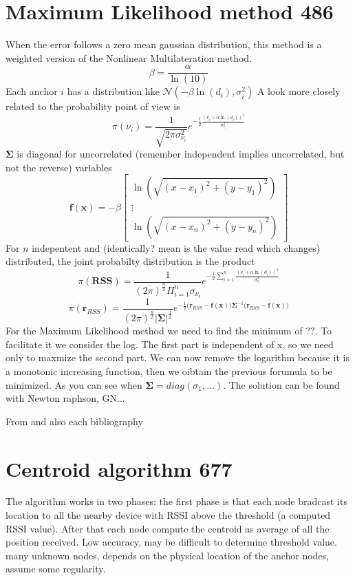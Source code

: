 \documentclass[12pt,twoside]{report}
\begin{document}
\section{Maximum Likelihood method 486}
When the error follows a zero mean gaussian distribution, this method is a weighted version of the Nonlinear Multilateration method. 
\begin{equation}
    \beta=\frac{\alpha}{\ln(10)}
\end{equation}
Each anchor $i$ has a distribution like $\mathcal{N}(-\beta\ln(d_i),\sigma^2_i)$
A look more closely related to the probability point of view is
\begin{equation}
    \pi(\nu_i)=\frac{1}{\sqrt{2\pi\sigma^2_{\nu_i}}}e^{-\frac{1}{2}\frac{(\nu_i+\alpha\ln(d_i))^2}{\sigma^2_{\nu_i}}}
\end{equation}
$\mathbf{\Sigma}$ is diagonal for uncorrelated (remember independent implies uncorrelated, but not the reverse) variables
$$\mathbf{f}(\mathbf{x})=-\beta\begin{bmatrix}
\ln(\sqrt{(x-x_1)^2+(y-y_1)^2})\\
\vdots\\
\ln(\sqrt{(x-x_n)^2+(y-y_n)^2})
\end{bmatrix}$$
For $n$ indepentent and (identically? mean is the value read which changes) distributed, the joint probabilty distribution is the product
\begin{equation}
    \pi(\mathbf{RSS})=\frac{1}{(2\pi)^{\frac{n}{2}}\Pi_{i=1}^n\sigma_{\nu_i}}e^{-\frac{1}{2}\sum_{i=1}^n\frac{(\nu_i+\alpha\ln(d_i))^2}{\sigma^2_{\nu_i}}}
\end{equation}
\begin{equation}
    \pi(\mathbf{r}_{RSS})=\frac{1}{(2\pi)^{\frac{n}{2}}|\mathbf{\Sigma}|^{\frac{1}{2}}}e^{-\frac{1}{2}\big(\mathbf{r}_{RSS}-\mathbf{f}(\mathbf{x})\big)\mathbf{\Sigma}^{-1}\big(\mathbf{r}_{RSS}-\mathbf{f}(\mathbf{x})\big)}
\end{equation}
For the Maximum Likelihood method we need to find the minimum of ??. To facilitate it we consider the log. The first part is independent of x, so we need only to maxmize the second part. We can now remove the logarithm because it is a monotonic increasing function, then we oibtain the previous forumula to be minimized. As you can see when $\mathbf{\Sigma}=diag{(\sigma_1,...)}$. The solution can be found with Newton raphson, GN...


From \cite{KAUR201982} and also each bibliography
\clearpage


\section{Centroid algorithm 677}
The algorithm works in two phases: the first phase is that each node bradcast its location to all the nearby device with RSSI above the threshold (a computed RSSI value). After that each node compute the centroid as average of all the position received. Low accuracy, may be difficult to determine threshold value. many unknown nodes, depends on the physical location of the anchor nodes, assume some regularity.
\end{document}
